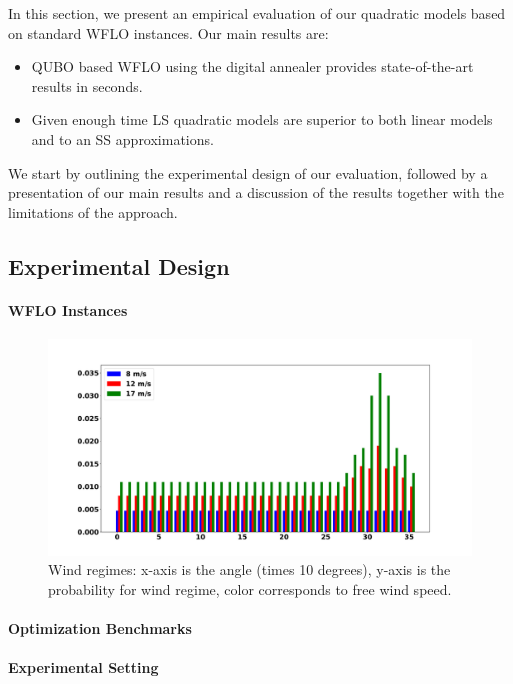 \documentclass[preprint,12pt]{elsarticle}
\begin{document}
In this section, we 
present an empirical evaluation of our quadratic models based on 
standard WFLO instances.
Our main results are: \begin{itemize}
	\item QUBO based WFLO using the digital annealer provides state-of-the-art results in seconds.
	\item Given enough time LS quadratic models are superior to both linear models and to an SS approximations. 
\end{itemize}
We start by outlining the experimental design of our evaluation, followed by a presentation of our main results
and a discussion of the results together with the limitations of the approach.

\subsection{Experimental Design}



\paragraph{WFLO Instances}
\begin{figure}[t]
	\centering
	\includegraphics[scale = 0.3]{prob_wind_pdf.pdf}
	
	\caption{Wind regimes: x-axis is the angle (times 10 degrees), y-axis is the probability for wind regime, color corresponds to free wind speed.}\label{fig:prob_wind}
\end{figure}

\paragraph{Optimization Benchmarks}

\paragraph{Experimental Setting}
\end{document}
